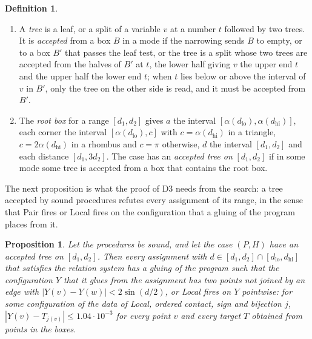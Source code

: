 \documentclass[12pt]{amsart}
\newtheorem{proposition}[theorem]{Proposition}
\theoremstyle{definition}
\newtheorem{definition}[theorem]{Definition}
\theoremstyle{plain}
\theoremstyle{definition}
\newcommand{\dlo}{d_{\mathrm{lo}}}
\newcommand{\dhi}{d_{\mathrm{hi}}}
\newcommand{\leanmap}[1]{\ignorespaces}
\newcommand{\mapnote}[1]{\ignorespaces}
\begin{document}
\begin{definition}
\begin{enumerate}
\item A \emph{tree} is a leaf, or a split of a variable $v$ at a number $t$ followed by two trees. It is \emph{accepted} from a box $B$ in a mode if the narrowing sends $B$ to empty, or to a box $B'$ that passes the leaf test, or the tree is a split whose two trees are accepted from the halves of $B'$ at $t$, the lower half giving $v$ the upper end $t$ and the upper half the lower end $t$; when $t$ lies below or above the interval of $v$ in $B'$, only the tree on the other side is read, and it must be accepted from $B'$.
\item The \emph{root box} for a range $[d_1,d_2]$ gives $a$ the interval $[\alpha(\dlo),\alpha(\dhi)]$, each corner the interval $[\alpha(\dlo),c]$ with $c=\alpha(\dhi)$ in a triangle, $c=2\alpha(\dhi)$ in a rhombus and $c=\pi$ otherwise, $d$ the interval $[d_1,d_2]$ and each distance $[d_1,3d_2]$. The case has an \emph{accepted tree on} $[d_1,d_2]$ if in some mode some tree is accepted from a box that contains the root box.
\end{enumerate}
\end{definition}

The next proposition is what the proof of D3 needs from the search: a tree accepted by sound procedures refutes every assignment of its range, in the sense that Pair fires or Local fires on the configuration that a gluing of the program places from it.

\begin{proposition}\label{prop:soundtrees}\leanmap{Tammes15.PaperSteps.progKilled_of_progTrees, Tammes15.PaperSteps.Search.Tree.sound, Tammes15.PaperSteps.glue_enclosure, Tammes15.PaperSteps.leafKill_sound, Tammes15.PaperSteps.root_mem}\mapnote{for every case of a list at once, the first declaration}
Let the procedures be sound, and let the case $(P,H)$ have an accepted tree on $[d_1,d_2]$. Then every assignment with $d\in[d_1,d_2]\cap[\dlo,\dhi]$ that satisfies the relation system has a gluing of the program such that the configuration $Y$ that it glues from the assignment has two points not joined by an edge with $|Y(v)-Y(w)|<2\sin(d/2)$, or Local fires on $Y$ pointwise: for some configuration of the data of Local, ordered contact, sign and bijection $j$, $|Y(v)-T_{j(v)}|\le1.04\cdot10^{-3}$ for every point $v$ and every target $T$ obtained from points in the boxes.
\end{proposition}
\end{document}
